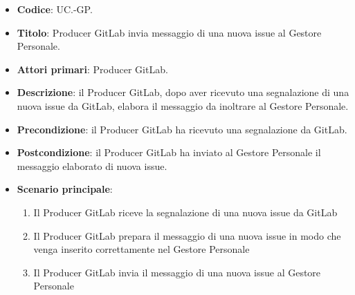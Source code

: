 	\begin{itemize}
		\item \textbf{Codice}: UC\theuccount.\thesubuccount-GP.
		\item \textbf{Titolo}: Producer GitLab invia messaggio di una nuova issue al Gestore Personale.
		\item \textbf{Attori primari}: Producer GitLab.
		\item \textbf{Descrizione}: il Producer GitLab, dopo aver ricevuto una segnalazione di una nuova issue da GitLab, elabora il messaggio da inoltrare al Gestore Personale.
		\item \textbf{Precondizione}: il Producer GitLab ha ricevuto una segnalazione da GitLab.
		\item \textbf{Postcondizione}: il Producer GitLab ha inviato al Gestore Personale il messaggio
		elaborato di nuova issue.
		\item \textbf{Scenario principale}:
		\begin{enumerate}
			\item Il Producer GitLab riceve la segnalazione di una nuova issue da GitLab
			\item Il Producer GitLab prepara il messaggio di una nuova issue in modo che venga inserito correttamente
			nel Gestore Personale
			\item Il Producer GitLab invia il messaggio di una nuova issue al Gestore Personale
		\end{enumerate}
	\end{itemize}


